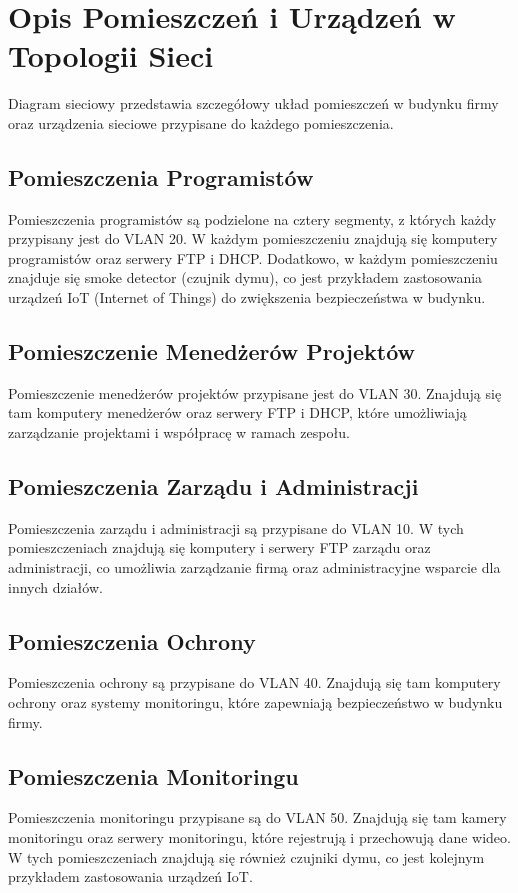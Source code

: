 \section{Opis Pomieszczeń i Urządzeń w Topologii Sieci}
Diagram sieciowy przedstawia szczegółowy układ pomieszczeń w budynku firmy oraz urządzenia sieciowe przypisane do każdego pomieszczenia.

\subsection{Pomieszczenia Programistów}
Pomieszczenia programistów są podzielone na cztery segmenty, z których każdy przypisany jest do VLAN 20. W każdym pomieszczeniu znajdują się komputery programistów oraz serwery FTP i DHCP. Dodatkowo, w każdym pomieszczeniu znajduje się smoke detector (czujnik dymu), co jest przykładem zastosowania urządzeń IoT (Internet of Things) do zwiększenia bezpieczeństwa w budynku.

\subsection{Pomieszczenie Menedżerów Projektów}
Pomieszczenie menedżerów projektów przypisane jest do VLAN 30. Znajdują się tam komputery menedżerów oraz serwery FTP i DHCP, które umożliwiają zarządzanie projektami i współpracę w ramach zespołu.

\subsection{Pomieszczenia Zarządu i Administracji}
Pomieszczenia zarządu i administracji są przypisane do VLAN 10. W tych pomieszczeniach znajdują się komputery i serwery FTP zarządu oraz administracji, co umożliwia zarządzanie firmą oraz administracyjne wsparcie dla innych działów.

\subsection{Pomieszczenia Ochrony}
Pomieszczenia ochrony są przypisane do VLAN 40. Znajdują się tam komputery ochrony oraz systemy monitoringu, które zapewniają bezpieczeństwo w budynku firmy.

\subsection{Pomieszczenia Monitoringu}
Pomieszczenia monitoringu przypisane są do VLAN 50. Znajdują się tam kamery monitoringu oraz serwery monitoringu, które rejestrują i przechowują dane wideo. W tych pomieszczeniach znajdują się również czujniki dymu, co jest kolejnym przykładem zastosowania urządzeń IoT.

